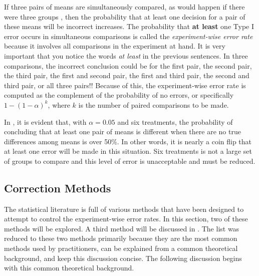 \documentclass[10pt,openany]{book}\usepackage[]{graphicx}\usepackage[]{color}
\begin{document}
\vspace{-12pt}

If three pairs of means are simultaneously compared, as would happen if there were three groups , then the probability that at least one decision for a pair of these means will be incorrect increases.  The probability that \textbf{at least} one Type I error occurs in simultaneous comparisons is called the \emph{experiment-wise error rate} because it involves all comparisons in the experiment at hand.  It is very important that you notice the words \emph{at least} in the previous sentences.  In three comparisons, the incorrect conclusion could be for the first pair, the second pair, the third pair, the first and second pair, the first and third pair, the second and third pair, or all three pairs!!  Because of this, the experiment-wise error rate is computed as the complement of the probability of no errors, or specifically $1-(1-\alpha)^{k}$, where $k$ is the number of paired comparisons to be made.


In , it is evident that, with $\alpha=0.05$ and six treatments, the probability of concluding that at least one pair of means is different when there are no true differences among means is over 50\%.  In other words, it is nearly a coin flip that at least one error will be made in this situation.  Six treatments is not a large set of groups to compare and this level of error is unacceptable and must be reduced.


\subsection{Correction Methods}
The statistical literature is full of various methods that have been designed to attempt to control the experiment-wise error rates.  In this section, two of these methods will be explored.  A third method will be discussed in .  The list was reduced to these two methods primarily because they are the most common methods used by practitioners, can be explained from a common theoretical background, and keep this discussion concise.  The following discussion begins with this common theoretical background.
\end{document}
